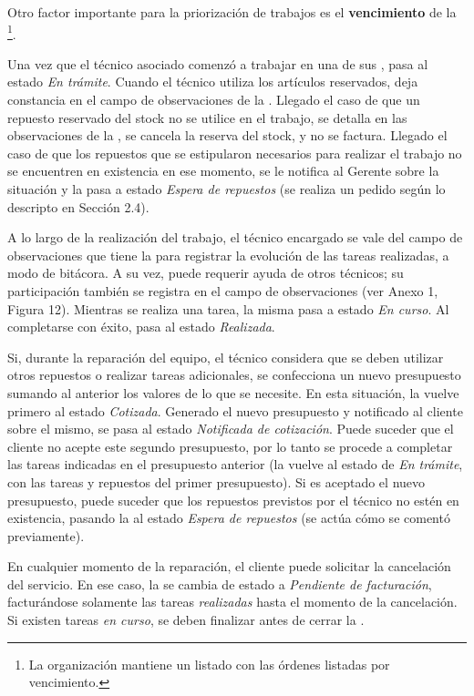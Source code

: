 \documentclass[12pt]{extarticle}
\begin{document}
\begin{spacing}{1.2}
    Otro factor importante para la priorización de trabajos es el \textbf{vencimiento} de la \OT{}\footnote{La organización mantiene un listado con las órdenes listadas por vencimiento.}. 
    
    Una vez que el técnico asociado comenzó a trabajar en una de sus \OT{}, pasa al estado \textit{En trámite}. Cuando el técnico utiliza los artículos reservados, deja constancia en el campo de observaciones de la \OT{}.  Llegado el caso de que un repuesto reservado del stock no se utilice en el trabajo, se detalla en las observaciones de la \OT{}, se cancela la reserva del stock, y no se factura. Llegado el caso de que los repuestos que se estipularon necesarios para realizar el trabajo no se encuentren en existencia en ese momento, se le notifica al Gerente sobre la situación y la \OT{} pasa a estado \textit{Espera de repuestos} (se realiza un pedido según lo descripto en Sección 2.4).

    A lo largo de la realización del trabajo, el técnico encargado se vale del campo de observaciones que tiene la \OT{} para registrar la evolución de las tareas realizadas, a modo de bitácora. A su vez, puede requerir ayuda de otros técnicos; su participación también se registra en el campo de observaciones (ver Anexo 1, Figura 12). Mientras se realiza una tarea, la misma pasa a estado \textit{En curso}. Al completarse con éxito, pasa al estado \textit{Realizada}.
    
    Si, durante la reparación del equipo, el técnico considera que se deben utilizar otros repuestos o realizar tareas adicionales, se confecciona un nuevo presupuesto sumando al anterior los valores de lo que se necesite. En esta situación, la \OT{} vuelve primero al estado \textit{Cotizada}. Generado el nuevo presupuesto y notificado al cliente sobre el mismo, se pasa al estado \textit{Notificada de cotización}. Puede suceder que el cliente no acepte este segundo presupuesto, por lo tanto se procede a completar las tareas indicadas en el presupuesto anterior (la \OT{} vuelve al estado de \textit{En trámite}, con las tareas y repuestos del primer presupuesto). Si es aceptado el nuevo presupuesto, puede suceder que los repuestos previstos por el técnico no estén en existencia, pasando la \OT{} al estado \textit{Espera de repuestos} (se actúa cómo se comentó previamente).
    
    En cualquier momento de la reparación, el cliente puede solicitar la cancelación del servicio. En ese caso, la \OT{} se cambia de estado a \textit{Pendiente de facturación}, facturándose solamente las tareas \textit{realizadas} hasta el momento de la cancelación. Si existen tareas \textit{en curso}, se deben finalizar antes de cerrar la \OT{}.
    

\end{spacing}
\end{document}
